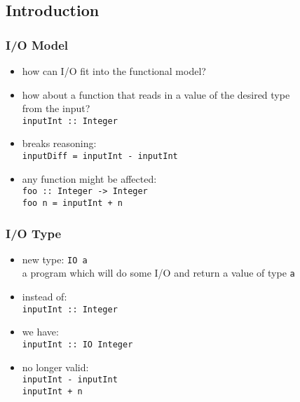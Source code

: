 \documentclass[dvipsnames]{beamer}
\theoremstyle{plain}
\begin{document}
\subsection{Introduction}

\begin{frame}
  \frametitle{I/O Model}

  \begin{itemize}
    \item how can I/O fit into the functional model?

    \bigskip
    \item how about a function that reads in a value of the desired type\\
      from the input?\\
      \smallskip
      \lstinline|inputInt :: Integer|

    \pause
    \medskip
    \item breaks reasoning:\\
      \smallskip
      \lstinline|inputDiff = inputInt - inputInt|

    \medskip
    \item any function might be affected:\\
      \smallskip
      \lstinline|foo :: Integer -> Integer|\\
      \lstinline|foo n = inputInt + n|\\
  \end{itemize}
\end{frame}

\begin{frame}
  \frametitle{I/O Type}

  \begin{itemize}
    \item new type: \lstinline|IO a|\\
      a program which will do some I/O and return a value of type \texttt{a}

    \medskip
    \item instead of:\\
      \smallskip
      \lstinline|inputInt :: Integer|
    \item we have:\\
      \smallskip
      \lstinline|inputInt :: IO Integer|

    \pause
    \medskip
    \item no longer valid:\\
      \texttt{inputInt - inputInt}\\
      \texttt{inputInt + n}
  \end{itemize}
\end{frame}
\end{document}
